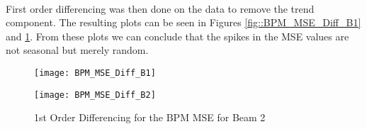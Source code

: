 \paragraph{ }First order differencing was then done on the data to remove the trend component. The resulting plots can be seen in Figures \ref{fig::BPM_MSE_Diff_B1} and \ref{fig::BPM_MSE_Diff_B2}. From these plots we can conclude that the spikes in the \acs{MSE} values are not seasonal but merely random.

\begin{figure}[!t]
	\begin{minipage}[b]{0.475\linewidth}
		\centering
		\texttt{[image: BPM\_MSE\_Diff\_B1]}
		\caption[BPM MSE Differencing B1]{1st Order Differencing for the BPM MSE for Beam 1}
		\label{fig::BPM_MSE_Diff_B1}
	\end{minipage}	
	\hspace{0.25cm}
	\begin{minipage}[b]{0.475\linewidth}
		\centering
		\texttt{[image: BPM\_MSE\_Diff\_B2]}
		\caption[BPM MSE Differencing B2]{1st Order Differencing for the BPM MSE for Beam 2}
		\label{fig::BPM_MSE_Diff_B2}
	\end{minipage}	
\end{figure}

